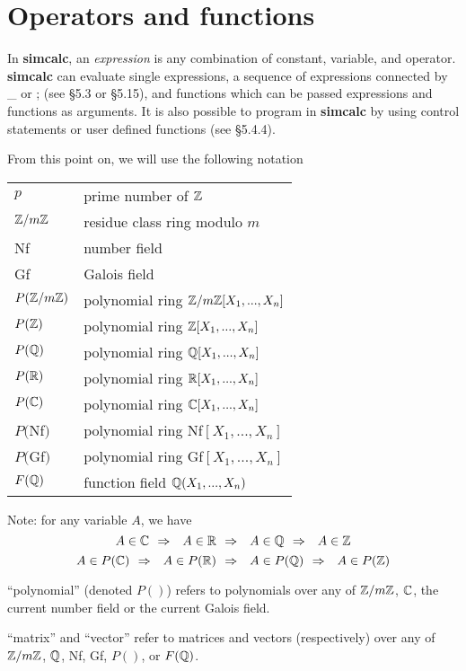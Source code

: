 \newpage


\section{Operators and functions}
In {\bf simcalc}, an {\em expression} is any combination of constant,
variable, and operator. {\bf simcalc} can evaluate single expressions, a
sequence of expressions connected by \_ or ; (see \S 5.3 or \S 5.15), and
functions which can be passed expressions and functions as arguments. It
is also possible to program in {\bf simcalc} by using control statements or
user defined functions (see \S 5.4.4).

From this point on, we will use the following notation

\begin{center}
\begin{tabular}{p{0.8in}p{3in}}
$p$ & prime number of $\Z$\\
$\Z/m\Z$ & residue class ring modulo $m$\\
Nf & number field\\
Gf & Galois field\\
$P(\Z /m\Z )$ & polynomial ring $\Z /m\Z [X_1,...,X_n]$\\
$P(\Z)$ & polynomial ring $\Z[X_1,...,X_n]$\\
$P(\Q)$ & polynomial ring $\Q[X_1,...,X_n]$\\
$P(\R)$ & polynomial ring $\R[X_1,...,X_n]$\\
$P(\C)$ & polynomial ring $\C[X_1,...,X_n]$\\
$P($Nf$)$ & polynomial ring Nf$[X_1,...,X_n]$\\
$P($Gf$)$ & polynomial ring Gf$[X_1,...,X_n]$\\
$F(\Q)$ & function field $\Q(X_1,...,X_n)$
\end{tabular}
\end{center}

Note: for any variable $A$, we have
$$
A \in \C \Ra A \in \R \Ra A \in \Q \Ra A \in \Z
$$
$$
A \in P(\C) \Ra A \in P(\R) \Ra A \in P(\Q) \Ra A \in P(\Z)
$$

``polynomial'' (denoted $P()$) refers to polynomials over any of $\Z/m\Z$, $\C$, the
current number field or the current Galois field.

``matrix'' and ``vector'' refer to matrices and vectors (respectively) over any of $\Z/m\Z$,
$\Q$, Nf, Gf, $P()$, or $F(\Q)$.

